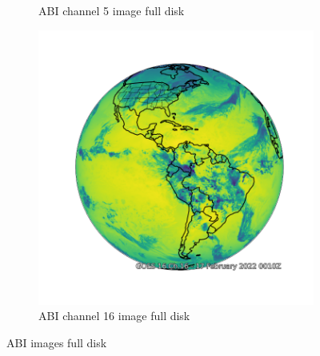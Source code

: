 \begin{figure}[h!]
\begin{subfigure}[b]{0.4\linewidth}
    \caption{ABI channel 5 image full disk}
  \end{subfigure}
  \begin{subfigure}[b]{0.4\linewidth}
    \includegraphics[width=\linewidth]{goes_fulldisk_C16.png}
    \caption{ABI channel 16 image full disk}
  \end{subfigure}
  \caption{ABI images full disk}
  \label{ABI images full disk}
\end{figure}
